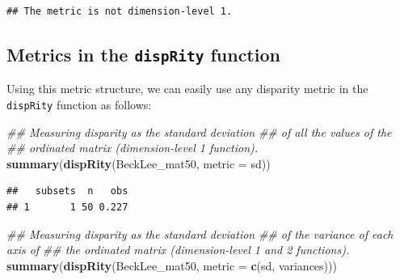 \documentclass[
]{book}
\newenvironment{Shaded}{\begin{snugshade}}{\end{snugshade}}
\newcommand{\CommentTok}[1]{\textcolor[rgb]{0.56,0.35,0.01}{\textit{#1}}}
\newcommand{\ControlFlowTok}[1]{\textcolor[rgb]{0.13,0.29,0.53}{\textbf{#1}}}
\newcommand{\DataTypeTok}[1]{\textcolor[rgb]{0.13,0.29,0.53}{#1}}
\newcommand{\KeywordTok}[1]{\textcolor[rgb]{0.13,0.29,0.53}{\textbf{#1}}}
\newcommand{\NormalTok}[1]{#1}
\newcommand{\OperatorTok}[1]{\textcolor[rgb]{0.81,0.36,0.00}{\textbf{#1}}}
\newcommand{\OtherTok}[1]{\textcolor[rgb]{0.56,0.35,0.01}{#1}}
\newcommand{\StringTok}[1]{\textcolor[rgb]{0.31,0.60,0.02}{#1}}
\begin{document}
\begin{Shaded}
\end{Shaded}

\begin{verbatim}
## The metric is not dimension-level 1.
\end{verbatim}

\hypertarget{metrics-in-the-disprity-function}{%
\subsection{\texorpdfstring{Metrics in the \texttt{dispRity} function}{Metrics in the dispRity function}}\label{metrics-in-the-disprity-function}}

Using this metric structure, we can easily use any disparity metric in the \texttt{dispRity} function as follows:

\begin{Shaded}
\begin{Highlighting}[]
\CommentTok{\#\# Measuring disparity as the standard deviation}
\CommentTok{\#\# of all the values of the}
\CommentTok{\#\# ordinated matrix (dimension{-}level 1 function).}
\KeywordTok{summary}\NormalTok{(}\KeywordTok{dispRity}\NormalTok{(BeckLee\_mat50, }\DataTypeTok{metric =}\NormalTok{ sd))}
\end{Highlighting}
\end{Shaded}

\begin{verbatim}
##   subsets  n   obs
## 1       1 50 0.227
\end{verbatim}

\begin{Shaded}
\begin{Highlighting}[]
\CommentTok{\#\# Measuring disparity as the standard deviation}
\CommentTok{\#\# of the variance of each axis of}
\CommentTok{\#\# the ordinated matrix (dimension{-}level 1 and 2 functions).}
\KeywordTok{summary}\NormalTok{(}\KeywordTok{dispRity}\NormalTok{(BeckLee\_mat50, }\DataTypeTok{metric =} \KeywordTok{c}\NormalTok{(sd, variances)))}
\end{Highlighting}
\end{Shaded}
\end{document}
